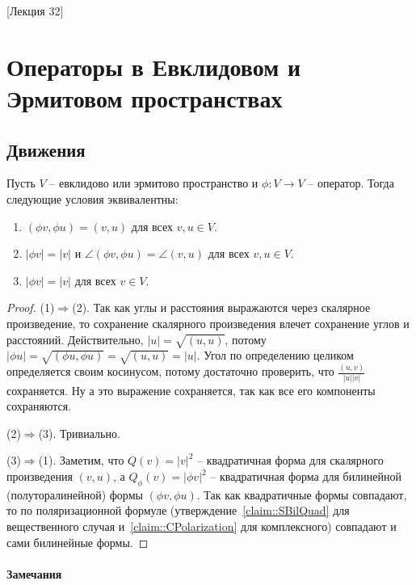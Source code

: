 [Лекция 32]


\newpage
\section{Операторы в Евклидовом и Эрмитовом пространствах}

\subsection{Движения}

\begin{claim}
Пусть $V$ -- евклидово или эрмитово пространство и $\phi\colon V\to V$ -- оператор.
Тогда следующие условия эквивалентны:
\begin{enumerate}
\item $(\phi v, \phi u) = (v, u)$ для всех $v, u\in V$.

\item $|\phi v| = |v|$ и $\angle(\phi v, \phi u) = \angle(v, u)$ для всех $v, u\in V$.

\item $|\phi v| = |v|$ для всех $v\in V$.
\end{enumerate}
\end{claim}
\begin{proof}
(1)$\Rightarrow$(2).
Так как углы и расстояния выражаются через скалярное произведение, то сохранение скалярного произведения влечет сохранение углов и расстояний.
Действительно, $|u| = \sqrt{(u,u)}$, потому $|\phi u| = \sqrt{(\phi u, \phi u)} = \sqrt{(u,u)}= |u|$.
Угол по определению целиком определяется своим косинусом, потому достаточно проверить, что $\frac{(u,v)}{|u| |v|}$ сохраняется.
Ну а это выражение сохраняется, так как все его компоненты сохраняются.


(2)$\Rightarrow$(3).
Тривиально.

(3)$\Rightarrow$(1).
Заметим, что $Q(v) = |v|^2$ -- квадратичная форма для скалярного произведения $(v,u)$, а $Q_\phi(v) = |\phi v|^2$ -- квадратичная форма для билинейной (полуторалинейной) формы $(\phi v, \phi u)$.
Так как квадратичные формы совпадают, то по поляризационной формуле (утверждение~\ref{claim::SBilQuad} для вещественного случая и~\ref{claim::CPolarization} для комплексного) совпадают и сами билинейные формы.
\end{proof}

\paragraph{Замечания}

